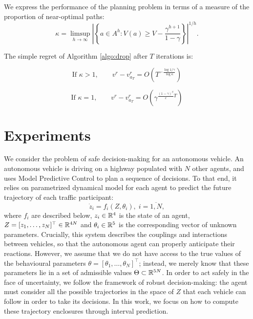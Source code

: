 \documentclass{article}
\begin{document}
We express the performance of the planning problem in terms of a measure of the proportion of near-optimal paths:
\[
\kappa = \limsup_{h\rightarrow\infty} \left|\left\{a\in A^h: V(a)\geq V - \frac{\gamma^{h+1}}{1-\gamma}\right\}\right|^{1/h}.
\]

\begin{theorem}
\label{theorem:drop-regret}
The simple regret of Algorithm \ref{algo:drop} after $T$ iterations is:

\begin{equation}
\text{If } \kappa>1,\qquad 
v^r - v^r_{a_T} = O\left(T^{-\frac{\log 1/\gamma}{\log \kappa}}\right)
\end{equation}

\begin{equation}
\text{If }\kappa=1,\qquad
v^r - v^r_{a_T} = O\left(\gamma^{\frac{(1-\gamma)^\beta}{c}T}\right)
\end{equation}
\end{theorem}

\section{Experiments}

We consider the problem of safe decision-making for an autonomous vehicle. An autonomous vehicle is driving on a highway populated with $N$ other agents, and uses Model Predictive Control to plan a sequence of decisions. To that end, it relies on parametrized dynamical model for each agent to predict the future trajectory of each traffic participant: \[\dot{z}_i=f_i(Z,\theta_i),\;i=\overline{1,N},\] where $f_i$ are described below, $z_i\in\mathbb{R}^4$ is the state of an agent, $Z = [z_1,\dots,z_N]^\top\in\mathbb{R}^{4N}$ and $\theta_i\in\mathbb{R}^5$ is the corresponding vector of unknown parameters. Crucially, this system describes the couplings and interactions between vehicles, so that the autonomous agent can properly anticipate their reactions. 
However, we assume that we do not have access to the true values of the behavioural parameters $\theta=[\theta_1,\dots,\theta_N]^\top$; instead, we merely know that these parameters lie in a set of admissible values $\Theta\subset\mathbb{R}^{5N}$. In order to act safely in the face of uncertainty, we follow the framework of robust decision-making: the agent must consider all the possible trajectories in the space of $Z$ that each vehicle can follow in order to take its decisions. In this work, we focus on how to compute these trajectory enclosures through interval prediction.
\end{document}

